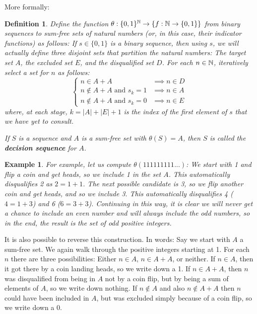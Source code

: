 \documentclass{report}
\newtheorem{definition}[theorem]{Definition}
\newtheorem{example}{Example}
\theoremstyle{remark}
\numberwithin{equation}{section}
\begin{document}
More formally: 

\begin{definition}Define the function
  $\theta : \{0,1\}^{\mathbb{N}} \to \{f : \mathbb{N} \to \{0,1\}\}$ from binary
  sequences to sum-free sets of natural numbers (or, in this case,
  their indicator functions) as follows: If $s\in\{0,1\}$ is a binary
  sequence, then using $s$, we will actually define three disjoint
  sets that partition the natural numbers: The target set $A$, the
  excluded set $E$, and the disqualified set $D$.  For each
  $n \in \mathbb{N}$, iteratively select a set for $n$ as follows:
\[\begin{cases}
n \in A+A &\implies n \in D\\
n \notin A+A \text{ and } s_k = 1 &\implies n \in A\\
n \notin A+A \text{ and } s_k = 0 &\implies n \in E
\end{cases}\]
where, at each stage, $k = |A|+|E|+1$ is the index of the first
element of $s$ that we have yet to consult. 

If $S$ is a sequence and $A$ is a sum-free set with $\theta(S) = A$,
then $S$ is called the \textbf{decision sequence} for $A$.
\end{definition}

\begin{example}
  For example, let us compute $\theta(111111111...)$: We start with 1
  and flip a coin and get heads, so we include 1 in the set $A$.  This
  automatically disqualifies 2 as $2 = 1+1$.  The next possible
  candidate is 3, so we flip another coin and get heads, and so we
  include 3.  This automatically disqualifies 4 ($4 = 1+3$) and 6
  ($6 = 3+3$).  Continuing in this way, it is clear we will never get
  a chance to include an even number and will always include the odd
  numbers, so in the end, the result is the set of odd positive
  integers.
\end{example}

It is also possible to reverse this construction.  In words: Say we
start with $A$ a sum-free set.  We again walk through the positive
integers starting at 1.  For each $n$ there are three possibilities:
Either $n \in A$, $n \in A+A$, or neither.  If $n \in A$, then it got
there by a coin landing heads, so we write down a 1.  If $n \in A+A$,
then $n$ was disqualified from being in $A$ not by a coin flip, but by
being a sum of elements of $A$, so we write down nothing.  If $n
\notin A$ and also $n \notin A+A$ then $n$ could have been included in
$A$, but was excluded simply because of a coin flip, so we write down
a 0.  
\end{document}
